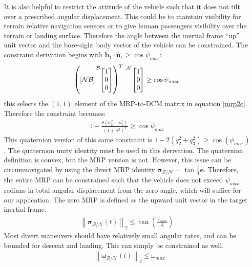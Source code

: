 \documentclass[conf]{new-aiaa}
\begin{document}
It is also helpful to restrict the attitude of the vehicle such that it does not tilt over a prescribed angular displacement. This could be to maintain visibility for terrain relative navigation sensors or to give human passengers visibility over the terrain or landing surface. Therefore the angle between the inertial frame ``up'' unit vector and the bore-sight body vector of the vehicle can be constrained. The constraint derivation begins with $\hat{\bm{b}}_1 \cdot \hat{\bm{n}}_1 \geq \cos{\psi_{max}}$:
\begin{align}
	\left (
	[\mathcal{NB}]
	\prescript{\mathcal{B}}{}{
	\begin{bmatrix}
		1 \\ 0 \\ 0
	\end{bmatrix}}
	\right )^T \
	\prescript{\mathcal{N}}{}{
	\begin{bmatrix}
		1 \\  0 \\ 0
	\end{bmatrix}}
	\geq \cos{\psi_{max}}
\end{align}
this selects the $(1,1)$ element of the MRP-to-DCM matrix in equation \ref{mrp2c}. Therefore the constraint becomes:
%
\begin{align}
\label{alignconstraint}
	1- \frac{8(\sigma_2^2 + \sigma_3^2)}{(1+\sigma^2)^2} \geq \cos{\psi_{max}}
\end{align}
This quaternion version of this same constraint is $1-2(q_{2}^{2}+q_{3}^{2}) \geq \cos(\psi_{max})$. The quaternion unity identity must be used in this derivation. The quaternion definition is convex, but the MRP version is not. However, this issue can be circumnavigated by using the direct MRP identity $\boldsymbol{\sigma}_\mathcal{B/N} = \tan\frac{\phi}{4}\hat{\bm{e}}$. Therefore, the entire MRP can be constrained such that the vehicle does not exceed $\psi_{max}$ radians in total angular displacement from the zero angle, which will suffice for our application. The zero MRP is defined as the upward unit vector in the target inertial frame.
\begin{align}
	\left \lVert \boldsymbol{\sigma}_\mathcal{B/N} (t) \right \lVert_2 \leq \tan \left( \frac{\psi_{max}}{4} \right)
\end{align}
Most divert maneuvers should have relatively small angular rates, and can be bounded for descent and landing. This can simply be constrained as well.
\begin{align}
& \left \lVert \bm{\omega}_\mathcal{B/N}(t) \right \lVert_2 \leq \omega_{max}
\end{align}
\end{document}
